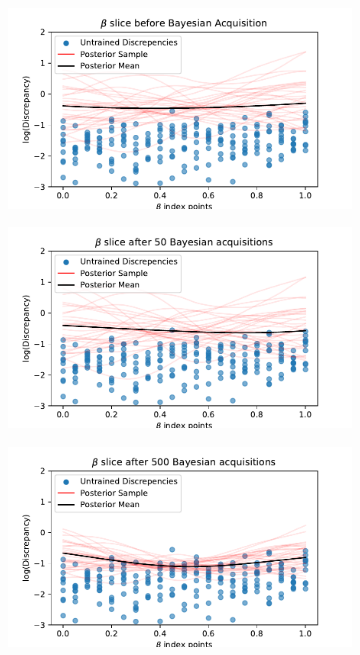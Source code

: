 \begin{figure}[htbp]
\begin{subfigure}[b]{0.33\textwidth}
    \end{subfigure}
    \hfill%
    \begin{subfigure}[b]{0.33\textwidth}
        \centering
        \includegraphics[width=\textwidth]{../champagne_GP_images/initial_beta_slice_log_discrep.pdf}
    \end{subfigure}%
    \hfill%
    \begin{subfigure}[b]{0.33\textwidth}
        \centering
        \includegraphics[width=\textwidth]{../champagne_GP_images/beta_slice_50_bolfi_updates_log_discrep.pdf}
    \end{subfigure}%
    \hfill%
    \begin{subfigure}[b]{0.33\textwidth}
        \centering
        \includegraphics[width=\textwidth]{../champagne_GP_images/beta_slice_500_bolfi_updates_log_discrep.pdf}

\end{subfigure}
\end{figure}
